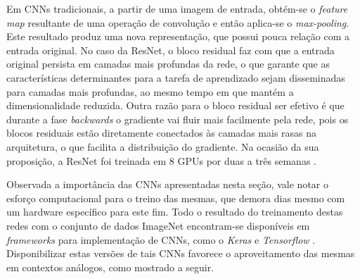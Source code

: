 Em CNNs tradicionais, a partir de uma imagem de entrada, obtém-se o \emph{feature map} resultante de uma operação de convolução e então aplica-se o \emph{max-pooling}. Este resultado produz uma nova representação, que possui pouca relação com a entrada original. No caso da ResNet, o bloco residual faz com que a entrada original persista em camadas mais profundas da rede, o que garante que as características determinantes para a tarefa de aprendizado sejam disseminadas para camadas mais profundas, ao mesmo tempo em que mantém a dimensionalidade reduzida. Outra razão para o bloco residual ser efetivo é que durante a fase \emph{backwards} o gradiente vai fluir mais facilmente pela rede, pois os blocos residuais estão diretamente conectados às camadas mais rasas na arquitetura, o que facilita a distribuição do gradiente. Na ocasião da sua proposição, a ResNet foi treinada em 8 GPUs por duas a três semanas \cite{resnet}.

Observada a importância das CNNs apresentadas nesta seção, vale notar o esforço computacional para o treino das mesmas, que demora dias mesmo com um hardware específico para este fim. Todo o resultado do treinamento destas redes com o conjunto de dados ImageNet encontram-se disponíveis em \emph{frameworks} para implementação de CNNs, como o  \emph{Keras} \cite{keras:applications} e \emph{Tensorflow} \cite{tensorflow:models}. Disponibilizar estas versões de tais CNNs favorece o aproveitamento das mesmas em contextos análogos, como mostrado a seguir.

